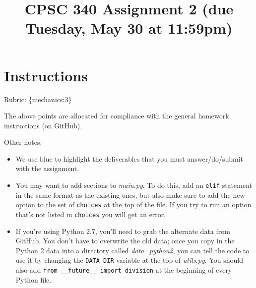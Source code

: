 \documentclass{article}
\begin{document}
\def\blu#1{{\color{blu}#1}}
\def\gre#1{{\color{gre}#1}}
\def\red#1{{\color{red}#1}}
\def\norm#1{\|#1\|}
\newcommand{\argmin}[1]{\mathop{\hbox{argmin}}_{#1}}
\newcommand{\argmax}[1]{\mathop{\hbox{argmax}}_{#1}}
\def\R{\mathbb{R}}
\newcommand{\fig}[2]{\texttt{[image: \#2]}}
\newcommand{\centerfig}[2]{\begin{center}\texttt{[image: \#2]}\end{center}}
\def\items#1{\begin{itemize}#1\end{itemize}}
\def\enum#1{\begin{enumerate}#1\end{enumerate}}
\def\answer#1{\iftoggle{answers}{\blu{Answer}:\\#1}}
\def\rubric#1{\gre{Rubric: \{#1\}}}{}


\title{CPSC 340 Assignment 2 (due Tuesday, May 30 at 11:59pm)}
\date{}
\maketitle

\vspace{-7em}

\section*{Instructions}
\rubric{mechanics:3}

The above points are allocated for compliance with the general homework instructions (on GitHub).

Other notes:
\begin{itemize}
\item We use \blu{blue} to highlight the deliverables that you must answer/do/submit with the assignment.
\item You may want to add sections to \emph{main.py}. To do this, add an \texttt{elif} statement in the same format as the existing ones, but also make sure to add the new option to the set of \texttt{choices} at the top of the file. If you try to run an option that's not listed in \texttt{choices} you will get an error.
\item If you're using Python 2.7, you'll need to grab the alternate data from GitHub. You don't have to overwrite the old data; once you copy in the Python 2 data into a directory called \emph{data\_python2}, you can tell the code to use it by changing the \texttt{DATA\string_DIR} variable at the top of \emph{utils.py}.
You should also add \verb|from __future__ import division| at the beginning of every Python file.
\end{itemize}
\end{document}
